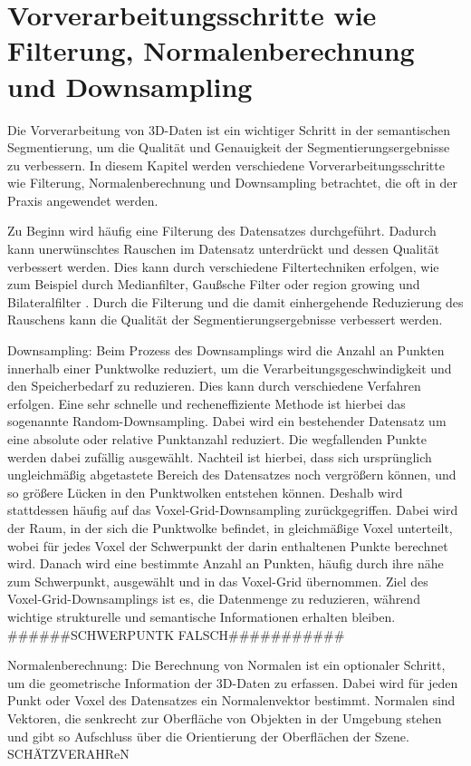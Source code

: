 \section{Vorverarbeitungsschritte wie Filterung, Normalenberechnung und Downsampling}

Die Vorverarbeitung von 3D-Daten ist ein wichtiger Schritt in der semantischen
Segmentierung, um die Qualität und Genauigkeit der Segmentierungsergebnisse zu
verbessern. In diesem Kapitel werden verschiedene Vorverarbeitungsschritte wie
Filterung, Normalenberechnung und Downsampling betrachtet, die oft in der
Praxis angewendet werden.

Zu Beginn wird häufig eine Filterung des Datensatzes durchgeführt. Dadurch kann
unerwünschtes Rauschen im Datensatz unterdrückt und dessen Qualität verbessert
werden. Dies kann durch verschiedene Filtertechniken erfolgen, wie zum Beispiel
durch Medianfilter, Gaußsche Filter \cite{9191237} oder region growing und
Bilateralfilter \cite{6460813}. Durch die Filterung und die damit einhergehende
Reduzierung des Rauschens kann die Qualität der Segmentierungsergebnisse
verbessert werden.

Downsampling: Beim Prozess des Downsamplings wird die Anzahl an Punkten
innerhalb einer Punktwolke reduziert, um die Verarbeitungsgeschwindigkeit und
den Speicherbedarf zu reduzieren. Dies kann durch verschiedene Verfahren
erfolgen. Eine sehr schnelle und recheneffiziente Methode ist hierbei das sogenannte
Random-Downsampling. Dabei wird ein bestehender Datensatz um eine absolute oder relative Punktanzahl 
reduziert. Die wegfallenden Punkte werden dabei zufällig
ausgewählt. Nachteil ist hierbei, dass sich ursprünglich ungleichmäßig
abgetastete Bereich des Datensatzes noch vergrößern können, und so größere Lücken in
den Punktwolken entstehen können. Deshalb wird stattdessen häufig auf das
Voxel-Grid-Downsampling zurückgegriffen. Dabei wird der Raum, in der sich die
Punktwolke befindet, in gleichmäßige Voxel unterteilt, wobei für jedes Voxel
der Schwerpunkt der darin enthaltenen Punkte berechnet wird. Danach wird eine
bestimmte Anzahl an Punkten, häufig durch ihre nähe zum Schwerpunkt, ausgewählt
und in das Voxel-Grid übernommen. Ziel des Voxel-Grid-Downsamplings ist es, die Datenmenge
zu reduzieren, während wichtige strukturelle und semantische Informationen
erhalten bleiben. ######SCHWERPUNTK FALSCH###########

Normalenberechnung: Die Berechnung von Normalen ist ein optionaler Schritt, um
die geometrische Information der 3D-Daten zu erfassen. Dabei wird für jeden
Punkt oder Voxel des Datensatzes ein Normalenvektor bestimmt. Normalen sind
Vektoren, die senkrecht zur Oberfläche von Objekten in der Umgebung stehen und
gibt so Aufschluss über die Orientierung der Oberflächen der Szene.
SCHÄTZVERAHReN


